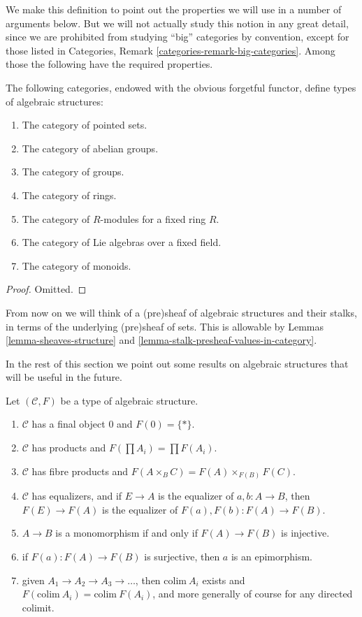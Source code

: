 \noindent
We make this definition to point out the properties
we will use in a number of arguments below.  But we will
not actually study this notion in any great detail, since we
are prohibited from studying ``big'' categories by convention,
except for those listed in
Categories, Remark \ref{categories-remark-big-categories}.
Among those the following have the required properties.

\begin{lemma}
\label{lemma-list-algebraic-structures}
The following categories, endowed with the obvious forgetful
functor, define types of algebraic structures:
\begin{enumerate}
\item The category of pointed sets.
\item The category of abelian groups.
\item The category of groups.
\item The category of rings.
\item The category of $R$-modules for a fixed ring $R$.
\item The category of Lie algebras over a fixed field.
\item The category of monoids.
\end{enumerate}
\end{lemma}

\begin{proof}
Omitted.
\end{proof}

\noindent
From now on we will think of a (pre)sheaf of algebraic structures
and their stalks, in terms of the underlying (pre)sheaf of sets.
This is allowable by Lemmas \ref{lemma-sheaves-structure} and
\ref{lemma-stalk-presheaf-values-in-category}.

\medskip\noindent
In the rest of this section we point out some results
on algebraic structures that will be useful in the future.

\begin{lemma}
\label{lemma-properties-algebraic-structures}
Let $(\mathcal{C}, F)$ be a type of algebraic structure.
\begin{enumerate}
\item $\mathcal{C}$ has a final object $0$ and $F(0) = \{ * \}$.
\item $\mathcal{C}$ has products and $F(\prod A_i) = \prod F(A_i)$.
\item $\mathcal{C}$ has fibre products and
$F(A\times_BC) = F(A)\times_{F(B)}F(C)$.
\item $\mathcal{C}$ has equalizers, and if $E \to A$
is the equalizer of $a, b : A \to B$, then
$F(E) \to F(A)$ is the equalizer of $F(a), F(b) : F(A) \to F(B)$.
\item $A \to B$ is a monomorphism if and only if
$F(A) \to F(B)$ is injective.
\item if $F(a) : F(A) \to F(B)$ is surjective, then
$a$ is an epimorphism.
\item given $A_1 \to A_2 \to A_3 \to \ldots$, then
$\text{colim}\ A_i$ exists and $F(\text{colim}\ A_i) = \text{colim}\ F(A_i)$,
and more generally of course for any directed colimit.
\end{enumerate}
\end{lemma}

